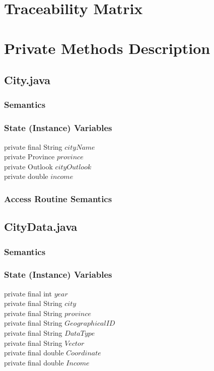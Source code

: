 \documentclass[12pt,fleqn]{article}
\begin{document}

\newpage
\section*{Traceability Matrix}


\newpage

\section*{Private Methods Description}
\subsection*{City.java}\label{pcity}

\subsubsection*{Semantics}
\subsubsection*{State (Instance) Variables}
	private final String $cityName$\\
	private Province $province$\\
	private Outlook $cityOutlook$\\
	private double $income$
\subsubsection*{Access Routine Semantics}


\subsection*{CityData.java}\label{pcityd}

\subsubsection*{Semantics}
\subsubsection*{State (Instance) Variables}
	private final int $year$\\
	private final String $city$\\
	private final String $province$\\
	private final String $GeographicalID$\\
	private final String $DataType$\\
	private final String $Vector$\\
	private final double $Coordinate$\\
	private final double $Income$
\end{document}
